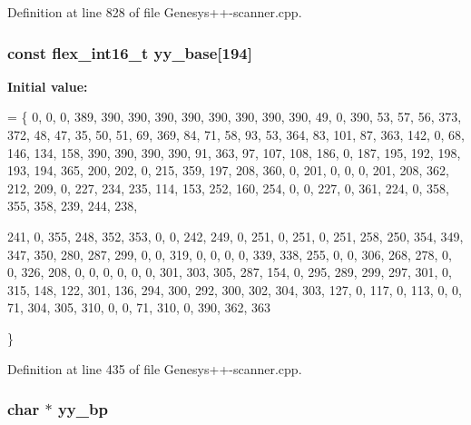 Definition at line 828 of file Genesys++-\/scanner.\-cpp.

\hypertarget{_genesys_09_09-scanner_8cpp_a3957db0c8e9ca44a14b97d031d9b1970}{
\subsubsection[{yy\-\_\-base}]{\setlength{\rightskip}{0pt plus 5cm}const {\bf flex\-\_\-int16\-\_\-t} yy\-\_\-base\mbox{[}194\mbox{]}\hspace{0.3cm}{\ttfamily [static]}}}\label{_genesys_09_09-scanner_8cpp_a3957db0c8e9ca44a14b97d031d9b1970}
{\bfseries Initial value\-:}
\begin{DoxyCode}
=
    \{   0,
        0,    0,  389,  390,  390,  390,  390,  390,  390,  390,
      390,   49,    0,  390,   53,   57,   56,  373,  372,   48,
       47,   35,   50,   51,   69,  369,   84,   71,   58,   93,
       53,  364,   83,  101,   87,  363,  142,    0,   68,  146,
      134,  158,  390,  390,  390,  390,   91,  363,   97,  107,
      108,  186,    0,  187,  195,  192,  198,  193,  194,  365,
      200,  202,    0,  215,  359,  197,  208,  360,    0,  201,
        0,    0,    0,  201,  208,  362,  212,  209,    0,  227,
      234,  235,  114,  153,  252,  160,  254,    0,    0,  227,
        0,  361,  224,    0,  358,  355,  358,  239,  244,  238,

      241,    0,  355,  248,  352,  353,    0,    0,  242,  249,
        0,  251,    0,  251,    0,  251,  258,  250,  354,  349,
      347,  350,  280,  287,  299,    0,    0,  319,    0,    0,
        0,    0,  339,  338,  255,    0,    0,  306,  268,  278,
        0,    0,  326,  208,    0,    0,    0,    0,    0,    0,
      301,  303,  305,  287,  154,    0,  295,  289,  299,  297,
      301,    0,  315,  148,  122,  301,  136,  294,  300,  292,
      300,  302,  304,  303,  127,    0,  117,    0,  113,    0,
        0,   71,  304,  305,  310,    0,    0,   71,  310,    0,
      390,  362,  363

    \}
\end{DoxyCode}


Definition at line 435 of file Genesys++-\/scanner.\-cpp.

\hypertarget{_genesys_09_09-scanner_8cpp_aa749693ef7d0c10b137e887638fdc5b2}{
\subsubsection[{yy\-\_\-bp}]{\setlength{\rightskip}{0pt plus 5cm}char $\ast$ yy\-\_\-bp}}\label{_genesys_09_09-scanner_8cpp_aa749693ef7d0c10b137e887638fdc5b2}


